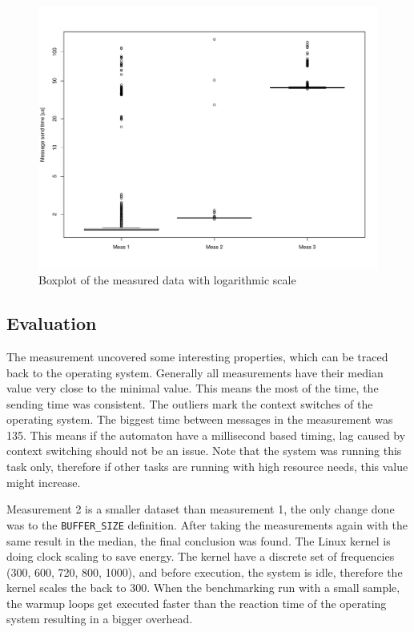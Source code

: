\begin{figure}[h]
	\centering
	\includegraphics[width = \textwidth]{include/figures/rpmsg_boxplot}
	\caption{Boxplot of the measured data with logarithmic scale}
\label{fig:rpmsg_boxplot}
\end{figure}

\subsection{Evaluation}

The measurement uncovered some interesting properties, which can be traced back to the operating system. Generally all measurements have their median value very close to the minimal value. This means the most of the time, the sending time was consistent. The outliers mark the context switches of the operating system. The biggest time between messages in the measurement was \si{135}{\mics}. This means if the automaton have a millisecond based timing, lag caused by context switching should not be an issue. Note that the system was running this task only, therefore if other tasks are running with high resource needs, this value might increase.

Measurement 2 is a smaller dataset than measurement 1, the only change done was to the \texttt{BUFFER\_SIZE} definition. After taking the measurements again with the same result in the median, the final conclusion was found. The Linux kernel is doing clock scaling to save energy. The kernel have a discrete set of frequencies (\si{300}{\MHz}, \si{600}{\MHz}, \si{720}{\MHz}, \si{800}{\MHz}, \si{1000}{\MHz}), and before execution, the system is idle, therefore the kernel scales the \cpu{} back to \si{300}{\MHz}. When the benchmarking run with a small sample, the warmup loops get executed faster than the reaction time of the operating system resulting in a bigger overhead.

